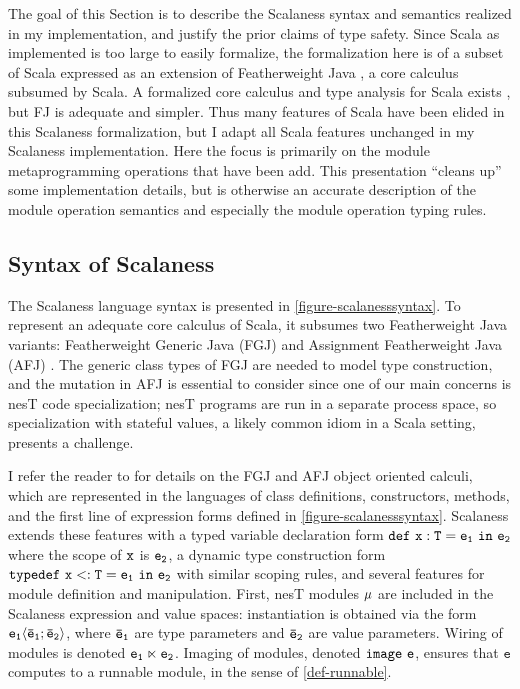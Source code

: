 The goal of this Section is to describe the Scalaness syntax and semantics realized in my
implementation, and justify the prior claims of type safety. Since Scala as implemented is too
large to easily formalize, the formalization here is of a subset of Scala expressed as an
extension of Featherweight Java \cite{FJ}, a core calculus subsumed by Scala. A formalized core
calculus and type analysis for Scala exists \cite{Cremet:2006:CCS:2135978.2135980}, but FJ is
adequate and simpler. Thus many features of Scala have been elided in this Scalaness
formalization, but I adapt all Scala features unchanged in my Scalaness implementation. Here the
focus is primarily on the module metaprogramming operations that have been add. This
presentation ``cleans up'' some implementation details, but is otherwise an accurate description
of the module operation semantics and especially the module operation typing rules.

\subsection{Syntax of Scalaness}

\scalanesssyntaxfig The Scalaness language syntax is presented in
\autoref{figure-scalanesssyntax}. To represent an adequate core calculus of Scala, it subsumes
two Featherweight Java variants: Featherweight Generic Java (FGJ) \cite{FJ} and Assignment
Featherweight Java (AFJ) \cite{AFJ}. The generic class types of FGJ are needed to model type
construction, and the mutation in AFJ is essential to consider since one of our main concerns is
nesT code specialization; nesT programs are run in a separate process space, so specialization
with stateful values, a likely common idiom in a Scala setting, presents a challenge.

I refer the reader to \cite{FJ,AFJ} for details on the FGJ and AFJ object oriented calculi,
which are represented in the languages of class definitions, constructors, methods, and the
first line of expression forms defined in \autoref{figure-scalanesssyntax}. Scalaness extends
these features with a typed variable declaration form $\jdef{x}{T}{e_1}{e_2}$ where the scope of
$\tt{x}$ is $\tt{e_2}$, a dynamic type construction form $\jtlet{x}{T}{e_1}{e_2}$ with similar
scoping rules, and several features for module definition and manipulation. First, nesT modules
$\jmodval$ are included in the Scalaness expression and value spaces: instantiation is obtained
via the form $\jinst{e_1}{\ttvec{e}_1; \ttvec{e}_2}$, where $\ttvec{e}_\texttt{1}$ are type
parameters and $\ttvec{e}_\texttt{2}$ are value parameters. Wiring of modules is denoted
$\jwire{\tt{e_1}}{\tt{e_2}}$. Imaging of modules, denoted $\jimage{\texttt{e}}$, ensures that
$\texttt{e}$ computes to a runnable module, in the sense of \autoref{def-runnable}.

